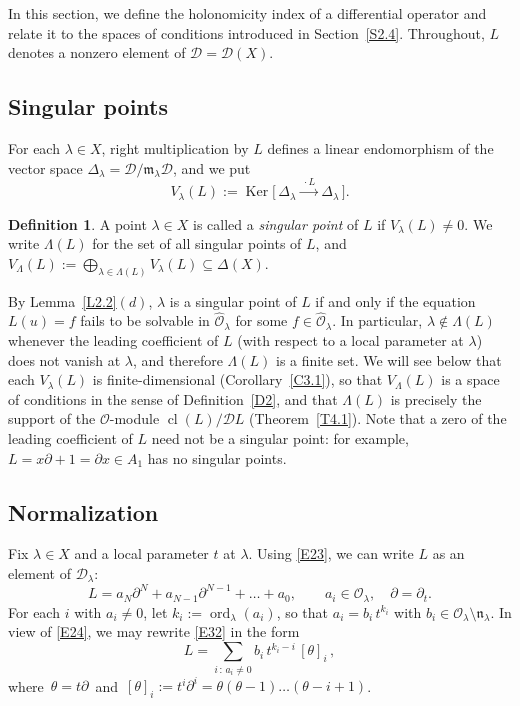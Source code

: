 \documentclass[11pt,reqno]{amsart}
\theoremstyle{plain}
\theoremstyle{definition}
\newtheorem{definition}{Definition}
\theoremstyle{remark}
\numberwithin{equation}{section}
\newcommand{\cD}{\mathcal{D}}
\newcommand{\cO}{\mathcal{O}}
\newcommand{\del}{\partial}
\newcommand{\ml}{\mathfrak{m}_\lambda}
\newcommand{\nl}{\mathfrak{n}_\lambda}
\newcommand{\hO}{\widehat{\cO}}
\newcommand{\Dl}{\Delta_\lambda}
\newcommand{\ff}[2]{[#1]_{#2}}          %
\DeclareMathOperator{\cl}{cl}
\DeclareMathOperator{\Ker}{Ker}
\DeclareMathOperator{\ord}{ord}
\begin{document}
In this section, we define the holonomicity index of a differential operator and relate it to the
spaces of conditions introduced in Section~\ref{S2.4}. Throughout, $L$ denotes a nonzero element
of $\cD = \cD(X)$.

\subsection{Singular points}
\label{S3.1}
For each $\lambda \in X$, right multiplication by $L$ defines a linear endomorphism of the vector
space $\Dl = \cD/\ml \cD$, and we put
\begin{equation}
\label{E31}
  V_\lambda(L) := \Ker\bigl[\, \Dl \xrightarrow{\ \cdot L\ } \Dl \,\bigr] .
\end{equation}

\begin{definition}
\label{D3}
A point $\lambda \in X$ is called a \emph{singular point} of $L$ if $V_\lambda(L) \ne 0$. We write
$\Lambda(L)$ for the set of all singular points of $L$, and
$V_\Lambda(L) := \bigoplus_{\lambda \in \Lambda(L)} V_\lambda(L) \subseteq \Delta(X)$.
\end{definition}

By Lemma~\ref{L2.2}$(d)$, $\lambda$ is a singular point of $L$ if and only if the equation
$L(u) = f$ fails to be solvable in $\hO_\lambda$ for some $f \in \hO_\lambda$. In particular,
$\lambda \notin \Lambda(L)$ whenever the leading coefficient of $L$ (with respect to a local
parameter at $\lambda$) does not vanish at $\lambda$, and therefore $\Lambda(L)$ is a finite set.
We will see below that each $V_\lambda(L)$ is finite-dimensional (Corollary~\ref{C3.1}), so that
$V_\Lambda(L)$ is a space of conditions in the sense of Definition~\ref{D2}, and that
$\Lambda(L)$ is precisely the support of the $\cO$-module $\cl(L)/\cD L$
(Theorem~\ref{T4.1}). Note that a zero of the leading coefficient of $L$ need not be a singular
point: for example, $L = x\del + 1 = \del x \in A_1$ has no singular points.

\subsection{Normalization}
\label{S3.2}
Fix $\lambda \in X$ and a local parameter $t$ at $\lambda$. Using \eqref{E23}, we can write $L$ as
an element of $\cD_\lambda$:
\begin{equation}
\label{E32}
  L = a_N \del^N + a_{N-1} \del^{N-1} + \ldots + a_0 , \qquad a_i \in \cO_\lambda , \quad
  \del = \del_t .
\end{equation}
For each $i$ with $a_i \ne 0$, let $k_i := \ord_\lambda(a_i)$, so that $a_i = b_i\, t^{k_i}$ with
$b_i \in \cO_\lambda \setminus \nl$. In view of \eqref{E24}, we may rewrite \eqref{E32} in the
form
\begin{equation}
\label{E33}
  L = \sum_{i \,:\, a_i \ne 0} b_i\, t^{k_i - i}\, \ff{\theta}{i}\, , 
\end{equation}
%
where $\,\theta = t \del\,$ and $\, \ff{\theta}{i} := t^i \partial^i = \theta(\theta-1) \ldots (\theta -i + 1)  $.
\end{document}
